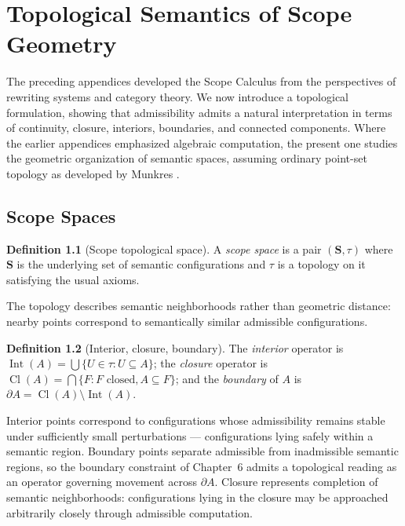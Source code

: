 \documentclass[11pt,twoside,openright]{book}
\numberwithin{equation}{chapter}
\theoremstyle{definition}
\newtheorem{definition}{Definition}[chapter]
\theoremstyle{plain}
\theoremstyle{remark}
\theoremstyle{definition}
\newcommand{\Scope}{\mathbf{S}}
\begin{document}
\chapter{Topological Semantics of Scope Geometry}
\label{app:topology}

The preceding appendices developed the Scope Calculus from the
perspectives of rewriting systems and category theory. We now introduce a
topological formulation, showing that admissibility admits a natural
interpretation in terms of continuity, closure, interiors, boundaries,
and connected components. Where the earlier appendices emphasized
algebraic computation, the present one studies the geometric organization
of semantic spaces, assuming ordinary point-set topology as developed by
Munkres \cite{Munkres2000}.

\section{Scope Spaces}

\begin{definition}[Scope topological space]
A \emph{scope space} is a pair $(\Scope,\tau)$ where $\Scope$ is the
underlying set of semantic configurations and $\tau$ is a topology on it
satisfying the usual axioms.
\end{definition}

The topology describes semantic neighborhoods rather than geometric
distance: nearby points correspond to semantically similar admissible
configurations.

\begin{definition}[Interior, closure, boundary]
The \emph{interior} operator is
$\operatorname{Int}(A)=\bigcup\{U\in\tau:U\subseteq A\}$; the
\emph{closure} operator is $\operatorname{Cl}(A)=\bigcap\{F:F\text{ closed},A\subseteq F\}$;
and the \emph{boundary} of $A$ is
$\partial A=\operatorname{Cl}(A)\setminus\operatorname{Int}(A)$.
\end{definition}

Interior points correspond to configurations whose admissibility remains
stable under sufficiently small perturbations --- configurations lying
safely within a semantic region. Boundary points separate admissible from
inadmissible semantic regions, so the boundary constraint of Chapter~6
admits a topological reading as an operator governing movement across
$\partial A$. Closure represents completion of semantic neighborhoods:
configurations lying in the closure may be approached arbitrarily closely
through admissible computation.
\end{document}
